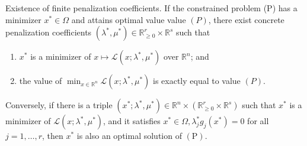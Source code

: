 \begin{theorem}[L8.1]{Existence of finite penalization coefficients.}
    If the constrained problem (P) has a minimizer $x^* \in \Omega$ and attains optimal value value $(P)$, there exist concrete penalization coefficients $\left(\lambda^*, \mu^*\right) \in \mathbb{R}_{\geq 0}^r \times \mathbb{R}^s$ such that
    \vspace{-4pt}\\
    \begin{enumerate}[leftmargin=*]
        \item $x^*$ is a minimizer of $x \mapsto \mathcal{L}\left(x ; \lambda^*, \mu^*\right)$ over $\mathbb{R}^n$; and
        \item the value of $\min _{x \in \mathbb{R}^n} \mathcal{L}\left(x ; \lambda^*, \mu^*\right)$ is exactly equal to value $(P)$.
    \end{enumerate}
    Conversely, if there is a triple $\left(x^* ; \lambda^*, \mu^*\right) \in \mathbb{R}^n \times\left(\mathbb{R}_{\geq 0}^r \times \mathbb{R}^s\right)$ such that $x^*$ is a minimizer of $\mathcal{L}\left(x ; \lambda^*, \mu^*\right)$, and it satisfies $x^* \in \Omega, \lambda_j^* g_j\left(x^*\right)=0$ for all $j=1, \ldots, r$, then $x^*$ is also an optimal solution of $(\mathrm{P})$.
\end{theorem}

